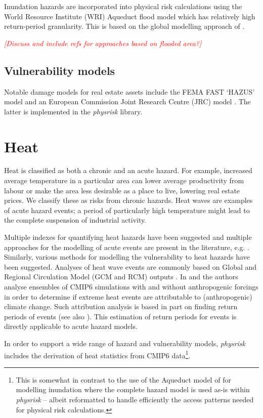 \documentclass[a4paper,11pt]{extarticle} %
\begin{document}
Inundation hazards are incorporated into physical risk calculations using the World Resource Institute (WRI) Aqueduct flood model \cite{WardEtAl:2020} which has relatively high return-period granularity. This is based on the global modelling approach of \cite{WardEtAl:2013}.

{\textcolor{red}{\emph{[Discuss and include refs for approaches based on flooded area?]}}}

\subsection{Vulnerability models}
Notable damage models for real estate assets include the FEMA FAST `HAZUS' model \cite{ScawthornEtAl:2006} and an European Commission Joint Research Centre (JRC) model \cite{HuizingaEtAl:2017}. The latter is implemented in the \emph{physrisk} library. 
 

\section{Heat}

Heat is classified as both a chronic and an acute hazard.  For example, increased average temperature in a particular area can lower average productivity from labour or make the area less desirable as a place to live, lowering real estate prices. We classify these as risks from chronic hazards. Heat waves are examples of acute hazard events; a period of particularly high temperature might lead to the complete suspension of industrial activity.

Multiple indexes for quantifying heat hazards have been suggested and multiple approaches for the modelling of acute events are present in the literature, e.g. \cite{MazdiyasniEtAl:2019}. Similarly, various methods for modelling the vulnerability to heat hazards have been suggested. Analyses of heat wave events are commonly based on Global and Regional Circulation Model (GCM and RCM) outputs \cite{DosioEtAl:2018}. In \cite{Christidis:2021} and \cite{Christidis:2013} the authors analyse ensembles of CMIP6 simulations with and without anthropogenic forcings in order to determine if extreme heat events are attributable to (anthropogenic) climate change. Such attribution analysis is based in part on finding return periods of events (see also \cite{StottEtAl:2016}). This estimation of return periods for events is directly applicable to acute hazard models.  

In order to support a wide range of hazard and vulnerability models,  \emph{physrisk} includes the derivation of heat statistics from CMIP6 data\footnote{This is somewhat in contrast to the use of the Aqueduct model of \cite{WardEtAl:2020} for modelling inundation where the complete hazard model is used as-is within \emph{physrisk} -- albeit reformatted to handle efficiently the access patterns needed for physical risk calculations.}. 
\end{document}

